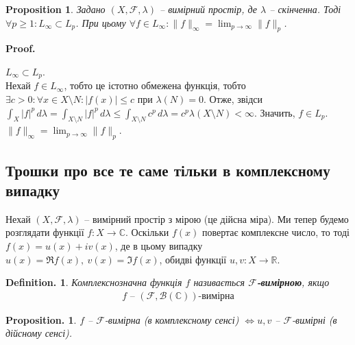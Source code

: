 \documentclass[a4paper, 10pt]{article}
\makeatletter
\theoremstyle{theoremdd}
\newtheorem{proposition}[theorem]{Proposition}
\newtheorem*{definition*}{Definition.}
\newtheorem*{proposition*}{Proposition.}
\renewenvironment{proof}[1][Proof.\\]{\par
\pushQED{\hfill \qed}%
\normalfont \topsep6\p@\@plus6\p@\relax
\trivlist
\item\relax
{\bfseries
#1\@addpunct{.}}\hspace\labelsep\ignorespaces
}{%
\popQED\endtrivlist\@endpefalse
}
\makeatother
\begin{document}
\begin{proposition}
Задано $(X,\mathcal{F},\lambda)$ -- вимірний простір, де $\lambda$ -- скінченна. Тоді $\forall p \geq 1: L_\infty \subset L_p$. При цьому $\forall f \in L_\infty: \|f\|_\infty = \displaystyle\lim_{p \to \infty} \|f\|_p$.
\end{proposition}

\begin{proof}
$L_\infty \subset L_p$.\\
Нехай $f \in L_\infty$, тобто це істотно обмежена функція, тобто $\exists c > 0: \forall x \in X \setminus N: |f(x)| \leq c$ при $\lambda(N) = 0$. Отже, звідси $\displaystyle\int_X |f|^p\,d\lambda = \int_{X \setminus N} |f|^p\,d\lambda \leq \int_{X \setminus N} c^p \,d\lambda = c^p \lambda(X \setminus N) < \infty$. Значить, $f \in L_p$.
\bigskip \\
$\|f\|_\infty = \displaystyle\lim_{p \to \infty} \|f\|_p$.\\
\end{proof}
\newpage

\subsection*{Трошки про все те саме тільки в комплексному випадку}
Нехай $(X,\mathcal{F},\lambda)$ -- вимірний простір з мірою (це дійсна міра). Ми тепер будемо розглядати функції $f \colon X \to \mathbb{C}$. Оскільки $f(x)$ повертає комплексне число, то тоді $f(x) = u(x) + iv(x)$, де в цьому випадку $u(x) = \Re f(x),\ v(x) = \Im f(x)$, обидві функції $u,v \colon X \to \mathbb{R}$.

\begin{definition*}
Комплекснозначна функція $f$ називається \textbf{$\mathcal{F}$-вимірною}, якщо
\begin{align*}
f \text{ -- } (\mathcal{F},\mathcal{B}(\mathbb{C})) \text{-вимірна}
\end{align*}
\end{definition*}

\begin{proposition*}
$f$ -- $\mathcal{F}$-вимірна (в комплексному сенсі) $\iff u,v$ -- $\mathcal{F}$-вимірні (в дійсному сенсі).
\end{proposition*}
\end{document}
